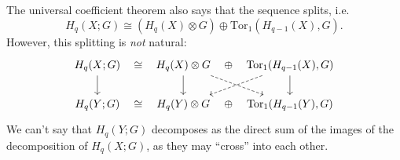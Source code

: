 \documentclass[12pt]{article}
\begin{document}
\begin{example}
	The universal coefficient theorem also says that the sequence splits, i.e. 
	\begin{equation*}
		H_q(X;G) \cong (H_q(X) \otimes G) \oplus \text{Tor}_1(H_{q-1}(X), G).
	\end{equation*}
	However, this splitting is \textit{not} natural:
	\begin{equation*}
\begin{tikzcd}
H_q(X;G) \arrow[d] \arrow[r, "\cong", phantom] & H_q(X)\otimes G \arrow[d] \arrow[r, "\oplus", phantom] \arrow[rd, dashed] & {\text{Tor}_1(H_{q-1}(X), G)} \arrow[d] \arrow[ld, dashed] \\
H_q(Y; G) \arrow[r, "\cong", phantom]                      & H_q(Y)\otimes G \arrow[r, "\oplus", phantom]                              & {\text{Tor}_1(H_{q-1}(Y), G)}                             
\end{tikzcd}
	\end{equation*}
	We can't say that $H_q(Y; G)$ decomposes as the direct sum of the images of the decomposition of $H_q(X;G)$, as they may ``cross'' into each other.
\end{example}
\end{document}
